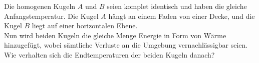 \begin{minipage}[b]{0.6\textwidth}
\begin{Exercise}[title = Wärmezufuhr, origin = 1. IPhO 1967, difficulty = 4, label = balls]
Die homogenen Kugeln $A$ und $B$ seien komplet identisch und haben die gleiche Anfangstemperatur. Die Kugel $A$ hängt an einem Faden von einer Decke, und die Kugel $B$ liegt auf einer horizontalen Ebene.\\
Nun wird beiden Kugeln die gleiche Menge Energie in Form von Wärme hinzugefügt, wobei sämtliche Verluste an die Umgebung vernachlässigbar seien. Wie verhalten sich die Endtemperaturen der beiden Kugeln danach?
\end{Exercise}
\end{minipage}
\begin{minipage}[t]{0.4\textwidth}
	\centering
\end{minipage}